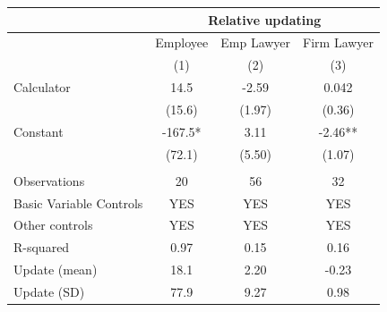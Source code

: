 \begin{tabular}{lccc}
\toprule
      & \multicolumn{3}{c}{Relative updating} \\
\midrule
\midrule
      & Employee & Emp Lawyer & Firm Lawyer \\
\midrule
      & (1)   & (2)   & (3) \\
\midrule
\midrule
Calculator & 14.5  & -2.59 & 0.042 \\
      & (15.6) & (1.97) & (0.36) \\
Constant  & -167.5* & 3.11  & -2.46** \\
      & (72.1) & (5.50) & (1.07) \\
      &       &       &  \\
\midrule
Observations & 20    & 56    & 32 \\
Basic Variable Controls  & YES   & YES   & YES \\
Other controls & YES   & YES   & YES \\
R-squared & 0.97  & 0.15  & 0.16 \\
Update (mean) & 18.1  & 2.20  & -0.23 \\
Update (SD) & 77.9  & 9.27  & 0.98 \\
\bottomrule
\bottomrule
\end{tabular}%
